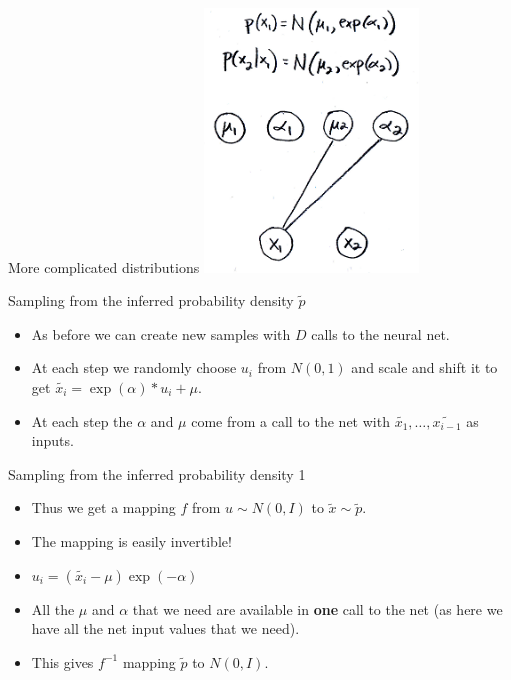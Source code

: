 \documentclass[usenames,dvipsnames]{beamer}
\begin{document}
\begin{frame}{More complicated distributions}
     \centering
     \includegraphics[height=7cm]{image_05}
\end{frame}


\begin{frame}{Sampling from the inferred probability density $\tilde{p}$}
    \begin{itemize}
      \item{As before we can create new samples with $D$ calls to the neural net.}
	\item{At each step we randomly choose $u_i$ from $N(0, 1)$ and scale and shift it to get $\tilde{x_i} = \exp(\alpha) * u_i + \mu$.}
	\item{At each step the $\alpha$ and $\mu$ come from a call to the net with $\tilde{x_1}, \dots, \tilde{x_{i-1}}$ as inputs.}
    \end{itemize}
\end{frame}

\begin{frame}{Sampling from the inferred probability density 1}
    \begin{itemize}
      \item{Thus we get a mapping $f$ from $u \sim N(0, I)$ to $\tilde{x} \sim \tilde{p}$.}
	\item{The mapping is easily invertible!}
	\item{$u_i = (\tilde{x_i} - \mu) \exp(-\alpha)$}
	\item{All the $\mu$ and $\alpha$ that we need are available in \textbf{one} call to the net (as here we have all the net input values that we need).}
	\item{This gives $f^{-1}$ mapping $\tilde{p}$ to $N(0, I)$.}
    \end{itemize}
\end{frame}
\end{document}
